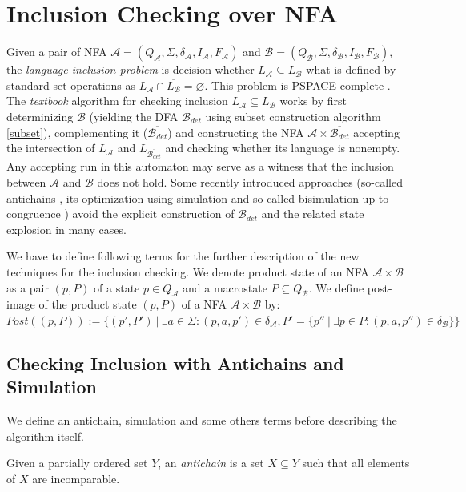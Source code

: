 \chapter{Inclusion Checking over NFA}
\label{chapInclusion}
Given a pair of NFA $\mathcal{A}=(Q_\mathcal{A},\Sigma,\delta_\mathcal{A},I_\mathcal{A},F_\mathcal{A})$ 
and $\mathcal{B}=(Q_\mathcal{B},\Sigma,\delta_\mathcal{B},I_\mathcal{B},F_\mathcal{B})$, 
the \emph{language inclusion problem} is decision whether $L_\mathcal{A} \subseteq L_\mathcal{B}$ what is defined by standard set operations as
$L_\mathcal{A}\cap \overline{L_\mathcal{B}} = \varnothing$.
This problem is PSPACE-complete \cite{cav06}. The \emph{textbook} algorithm for checking inclusion $L_\mathcal{A}\subseteq L_\mathcal{B}$ works by first 
determinizing $\mathcal{B}$ (yielding the DFA 
$\mathcal{B}_{det}$ using subset construction algorithm \ref{subset}), 
complementing it ($\overline{\mathcal{B}_{det}}$) and constructing the NFA $\mathcal{A} \times \overline{\mathcal{B}_{det}}$ 
accepting the intersection of $L_{\mathcal{A}}$ and ${L_{\overline{\mathcal{B}_{det}}}}$ and
checking whether its language is nonempty. Any accepting run in this automaton may serve as a witness that the inclusion between $\mathcal{A}$ 
and $\mathcal{B}$ does not hold.
Some recently introduced approaches (so-called antichains \cite{cav06}, its optimization using simulation \cite{tacas10} and so-called bisimulation up to
congruence \cite{popl13}) avoid the explicit construction of $\overline{\mathcal{B}_{det}}$ and the related state explosion in many cases.

We have to define following terms for the further description of the new techniques for the inclusion checking.
We denote product state of an NFA $\mathcal{A} \times \mathcal{B}$ as a pair $(p,P)$ of a state $p\in Q_\mathcal{A}$ and a macrostate $P \subseteq Q_\mathcal{B}$.
We define post-image of the product state $(p,P)$ of a NFA $\mathcal{A}\times \mathcal{B}$ by:\
$Post((p,P)):=\{(p',P')\ |\ \exists a \in \Sigma: (p,a,p')\in \delta_\mathcal{A}, P'=\{p''\ |\ \exists p \in P:(p,a,p'')\in \delta_\mathcal{B}\}\}$

\section{Checking Inclusion with Antichains and Simulation}
\label{sectionAntichain}
We define an antichain, simulation and some others terms before describing the algorithm itself.

Given a partially ordered set $Y$, an \emph {antichain} is a set $X \subseteq Y$ such that all elements of $X$ are incomparable.

